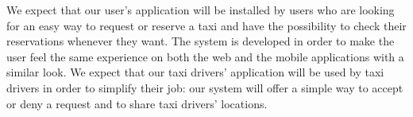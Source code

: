 	We expect that our user's application will be installed by users who are looking for an easy way to request or reserve a taxi and have the possibility to check their reservations whenever they want.
	The system is developed in order to make the user feel the same experience on both the web and the mobile applications with a similar look.
	\newline
	We expect that our taxi drivers' application will be used by taxi drivers in order to simplify their job: our system will offer a simple way to accept or deny a request and to share taxi drivers' locations.